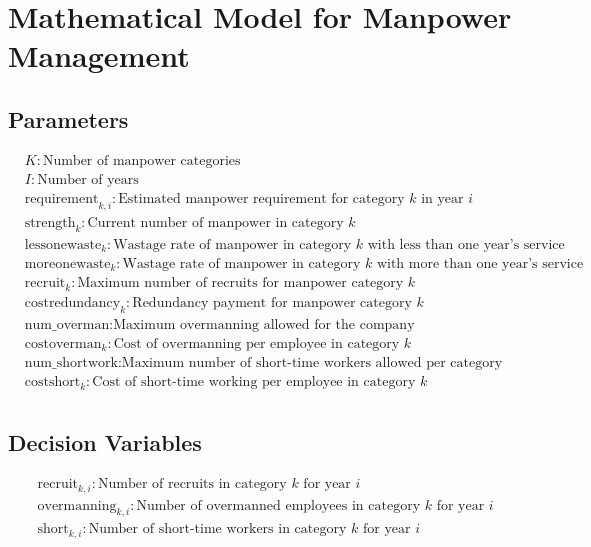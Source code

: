 \documentclass{article}
\begin{document}
\section*{Mathematical Model for Manpower Management}

\subsection*{Parameters}
\begin{align*}
& K: \text{Number of manpower categories} \\
& I: \text{Number of years} \\
& \text{requirement}_{k, i}: \text{Estimated manpower requirement for category } k \text{ in year } i \\
& \text{strength}_{k}: \text{Current number of manpower in category } k \\
& \text{lessonewaste}_{k}: \text{Wastage rate of manpower in category } k \text{ with less than one year's service} \\
& \text{moreonewaste}_{k}: \text{Wastage rate of manpower in category } k \text{ with more than one year's service} \\
& \text{recruit}_{k}: \text{Maximum number of recruits for manpower category } k \\
& \text{costredundancy}_{k}: \text{Redundancy payment for manpower category } k \\
& \text{num\_overman}: \text{Maximum overmanning allowed for the company} \\
& \text{costoverman}_{k}: \text{Cost of overmanning per employee in category } k \\
& \text{num\_shortwork}: \text{Maximum number of short-time workers allowed per category} \\
& \text{costshort}_{k}: \text{Cost of short-time working per employee in category } k \\
\end{align*}

\subsection*{Decision Variables}
\begin{align*}
& \text{recruit}_{k, i}: \text{Number of recruits in category } k \text{ for year } i \\
& \text{overmanning}_{k, i}: \text{Number of overmanned employees in category } k \text{ for year } i \\
& \text{short}_{k, i}: \text{Number of short-time workers in category } k \text{ for year } i \\
\end{align*}
\end{document}
